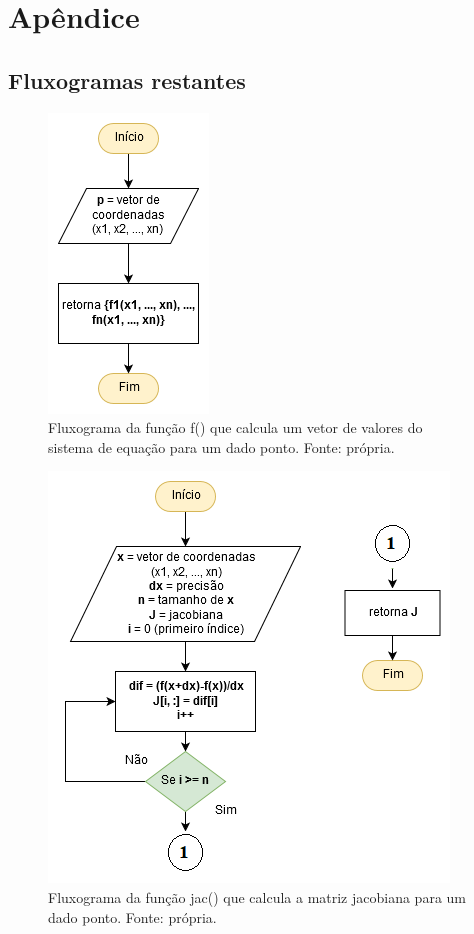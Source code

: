 \documentclass[a4paper, 12pt, openright, oneside]{article}
\begin{document}
\newpage



\section{Apêndice}
\subsection{Fluxogramas restantes}
\begin{figure}[!htb]
\centering
\includegraphics[scale=0.7]{Imagens/diag_func.png}
\caption{Fluxograma da função f() que calcula um vetor de valores do sistema de equação para um dado ponto. Fonte: própria.}
\label{galvanometro}
\end{figure}

\begin{figure}[!htb]
\centering
\includegraphics[scale=0.7]{Imagens/diag_jac1.png}
\caption{Fluxograma da função jac() que calcula a matriz jacobiana para um dado ponto. Fonte: própria.}
\label{galvanometro}
\end{figure}
\end{document}
